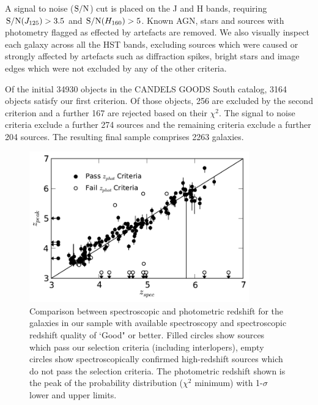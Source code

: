 A signal to noise ($\textup{S/N}$) cut is placed on the J and H bands, requiring $\textup{S/N}(J_{125}) > 3.5$ and $\textup{S/N}(H_{160}) > 5$. Known AGN, stars and sources with photometry flagged as effected by artefacts are removed. We also visually inspect each galaxy across all the HST bands, excluding sources which were caused or strongly affected by artefacts such as diffraction spikes, bright stars and image edges which were not excluded by any of the other criteria. 

Of the initial 34930 objects in the CANDELS GOODS South catalog, 3164 objects satisfy our first criterion. Of those objects, 256 are excluded by the second criterion and a further 167 are rejected based on their $\chi^{2}$. The signal to noise criteria exclude a further 274 sources and the remaining criteria exclude a further 204 sources. The resulting final sample comprises 2263 galaxies.

\begin{figure}
\centering
\includegraphics[width=95mm]{plots/fig1.pdf}
\caption[Comparison of photometric redshifts with available spectroscopic redshifts.]{Comparison between spectroscopic and photometric redshift for the galaxies in our sample with available spectroscopy and spectroscopic redshift quality of `Good" or better. Filled circles show sources which pass our selection criteria (including interlopers), empty circles show spectroscopically confirmed high-redshift sources which do not pass the selection criteria. The photometric redshift shown is the peak of the probability distribution ($\chi^2$ minimum) with 1-$\sigma$ lower and upper limits.}
\label{fig:specz}
\end{figure}


